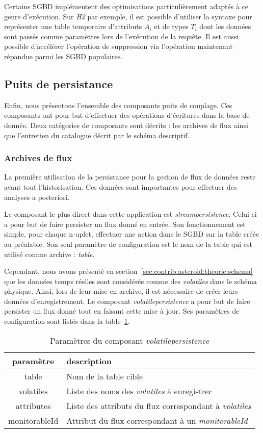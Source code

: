 Certains SGBD implémentent des optimisations particulièrement adaptés à ce genre d'exécution. Sur \textit{H2} par exemple, il est possible d'utiliser la syntaxe  pour représenter une table temporaire d'attributs $A_i$ et de types $T_i$ dont les données sont passés comme paramètres lors de l'exécution de la requête. Il est aussi possible d'accélérer l'opération de suppression via l'opération  maintenant répandue parmi les SGBD populaires.

\subsection{Puits de persistance}
Enfin, nous présentons l'ensemble des composants puits de couplage. Ces composants ont pour but d'effectuer des opérations d'écritures dans la base de donnée. Deux catégories de composants sont décrits : les archives de flux ainsi que l'entretien du catalogue décrit par le schéma descriptif.
\subsubsection{Archives de flux}
La première utilisation de la persistance pour la gestion de flux de données reste avant tout l'historisation. Ces données sont importantes pour effectuer des analyses a posteriori.

Le composant le plus direct dans cette application est \textit{streampersistence}. Celui-ci a pour but de faire persister un flux donné en entrée. Son fonctionnement est simple, pour chaque n-uplet, effectuer une action  dans le SGBD sur la table créée au préalable. Son seul paramètre de configuration est le nom de la table qui est utilisé comme archive : \textit{table}.

Cependant, nous avons présenté en section~\ref{sec:contrib:asteroid:theorie:schema} que les données temps réelles sont considérés comme des \textit{volatiles} dans le schéma physique. Ainsi, lors de leur mise en archive, il est nécessaire de créer leurs données d'enregistrement. Le composant \textit{volatilepersistence} a pour but de faire persister un flux donné tout en faisant cette mise à jour. Ses paramètres de configuration sont listés dans la table~\ref{tab:contrib:asteroid:volatilepersistence}.

\begin{table}[ht]
    \centering
    \begin{tabular}{cl}
        paramètre & description \\ \midrule
        table & Nom de la table cible\\
        volatiles & Liste des noms des \textit{volatiles} à enregistrer\\
        attributes & Liste des attributs du flux correspondant à \textit{volatiles}\\
        monitorableId & Attribut du flux correspondant à un \textit{monitorableId}
    \end{tabular}
    \caption{Paramètres du composant \textit{volatilepersistence}}\label{tab:contrib:asteroid:volatilepersistence}
\end{table}

